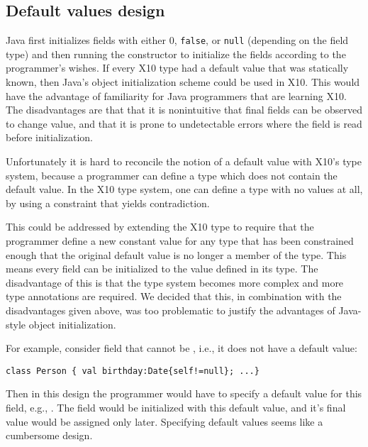 

\subsection{Default values design}

Java first initializes fields with either $0$, \texttt{false}, or \texttt{null}
(depending on the field type) and then running the constructor to initialize
the fields according to the programmer's wishes.  If every X10 type had a
default value that was statically known, then Java's object initialization
scheme could be used in X10.  This would have the advantage of familiarity for
Java programmers that are learning X10.  The disadvantages are that that it is
nonintuitive that final fields can be observed to change value, and that it is
prone to undetectable errors where the field is read before initialization.

Unfortunately it is hard to reconcile the notion of a default value with X10's
type system, because a programmer can define a type which does not contain the
default value.  In the X10 type system, one can define a type with no values at
all, by using a constraint that yields contradiction.

This could be addressed by extending the X10 type to require that the
programmer define a new constant value for any type that has been constrained
enough that the original default value is no longer a member of the type.  This
means every field can be initialized to the value defined in its type.  The
disadvantage of this is that the type system becomes more complex and more type
annotations are required.  We decided that this, in combination with the
disadvantages given above, was too problematic to justify the advantages of
Java-style object initialization.

For example, consider field  that cannot be , i.e., it does not have a default value:
\begin{lstlisting}
class Person { val birthday:Date{self!=null}; ...}
\end{lstlisting}
Then in this design the programmer would have to specify a default value for this field,
    e.g., .
The field would be initialized with this default value, and it's final value would be assigned only later.
Specifying default values seems like a cumbersome design.

